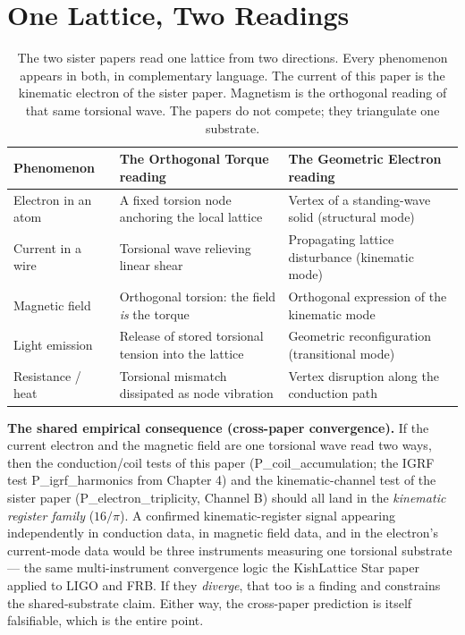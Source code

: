 \documentclass[11pt, letterpaper, openany]{book}
\begin{document}
\section{One Lattice, Two Readings}
 
\begin{table}[H]
\centering
\renewcommand{\arraystretch}{1.5}
\small
\begin{tabular}{|p{4.2cm}|p{4.0cm}|p{4.0cm}|}
\hline
\rowcolor{kishblue!10}
\textbf{Phenomenon} & \textbf{The Orthogonal Torque reading} &
\textbf{The Geometric Electron reading} \\
\hline\hline
Electron in an atom &
A fixed torsion node anchoring the local lattice &
Vertex of a standing-wave solid (structural mode) \\
\hline
Current in a wire &
Torsional wave relieving linear shear &
Propagating lattice disturbance (kinematic mode) \\
\hline
Magnetic field &
Orthogonal torsion: the field \emph{is} the torque &
Orthogonal expression of the kinematic mode \\
\hline
Light emission &
Release of stored torsional tension into the lattice &
Geometric reconfiguration (transitional mode) \\
\hline
Resistance / heat &
Torsional mismatch dissipated as node vibration &
Vertex disruption along the conduction path \\
\hline
\end{tabular}
\caption{The two sister papers read one lattice from two directions. Every
phenomenon appears in both, in complementary language. The current of this
paper is the kinematic electron of the sister paper. Magnetism is the
orthogonal reading of that same torsional wave. The papers do not compete;
they triangulate one substrate.}
\end{table}
 
\begin{empiricalbox}
\textbf{The shared empirical consequence (cross-paper convergence).}
If the current electron and the magnetic field are one torsional wave read
two ways, then the conduction/coil tests of this paper
(P\_coil\_accumulation; the IGRF test P\_igrf\_harmonics from Chapter 4)
and the kinematic-channel test of the sister paper
(P\_electron\_triplicity, Channel B) should all land in the
\emph{kinematic register family} ($16/\pi$). A confirmed kinematic-register
signal appearing independently in conduction data, in magnetic field data,
and in the electron's current-mode data would be three instruments
measuring one torsional substrate --- the same multi-instrument convergence
logic the KishLattice Star paper applied to LIGO and FRB. If they
\emph{diverge}, that too is a finding and constrains the shared-substrate
claim. Either way, the cross-paper prediction is itself falsifiable, which
is the entire point.
\end{empiricalbox}
 
\end{document}
